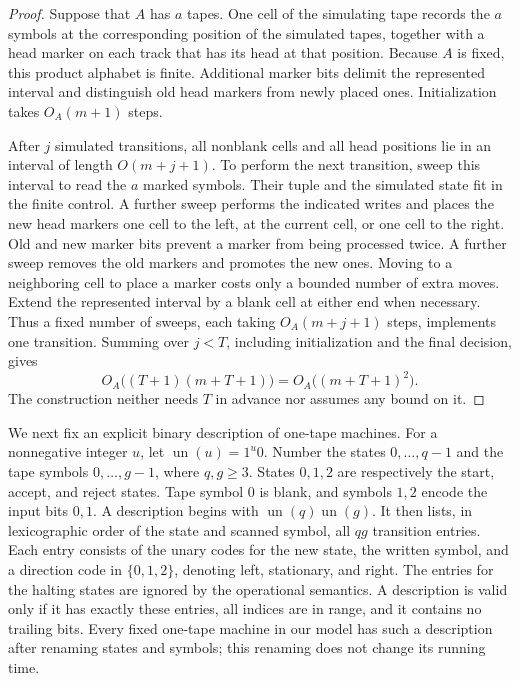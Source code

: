 \begin{proof}
Suppose that $A$ has $a$ tapes.  One cell of the simulating tape records the
$a$ symbols at the corresponding position of the simulated tapes, together
with a head marker on each track that has its head at that position.  Because
$A$ is fixed, this product alphabet is finite.  Additional marker bits delimit
the represented interval and distinguish old head markers from newly placed
ones.  Initialization takes $O_A(m+1)$ steps.

After $j$ simulated transitions, all nonblank cells and all head positions lie
in an interval of length $O(m+j+1)$.  To perform the next transition, sweep
this interval to read the $a$ marked symbols.  Their tuple and the simulated
state fit in the finite control.  A further sweep performs the indicated
writes and places the new head markers one cell to the left, at the current
cell, or one cell to the right.  Old and new marker bits prevent a marker
from being processed twice.  A further sweep removes the old markers and
promotes the new ones.  Moving to a neighboring cell to place a marker costs
only a bounded number of extra moves.  Extend the represented interval by a
blank cell at either end when necessary.  Thus a fixed number of sweeps,
each taking $O_A(m+j+1)$ steps, implements one transition.  Summing over
$j<T$, including initialization and the final decision, gives
\[
 O_A\bigl((T+1)(m+T+1)\bigr)
       =O_A\bigl((m+T+1)^2\bigr).
\]
The construction neither needs $T$ in advance nor assumes any bound on it.
\end{proof}

We next fix an explicit binary description of one-tape machines.  For a
nonnegative integer $u$, let $\operatorname{un}(u)=1^u0$.  Number the states
$0,\ldots,q-1$ and the tape symbols $0,\ldots,g-1$, where $q,g\geq 3$.
States $0,1,2$ are respectively the start, accept, and reject states.  Tape
symbol $0$ is blank, and symbols $1,2$ encode the input bits $0,1$.
A description begins with $\operatorname{un}(q)\operatorname{un}(g)$.
It then lists, in lexicographic order of the state and scanned symbol, all
$qg$ transition entries.  Each entry consists of the unary codes for the
new state, the written symbol, and a direction code in $\{0,1,2\}$, denoting
left, stationary, and right.  The entries for the halting states are ignored
by the operational semantics.  A description is valid only if it has exactly
these entries, all indices are in range, and it contains no trailing bits.
Every fixed one-tape machine in our model has such a description after
renaming states and symbols; this renaming does not change its running time.

